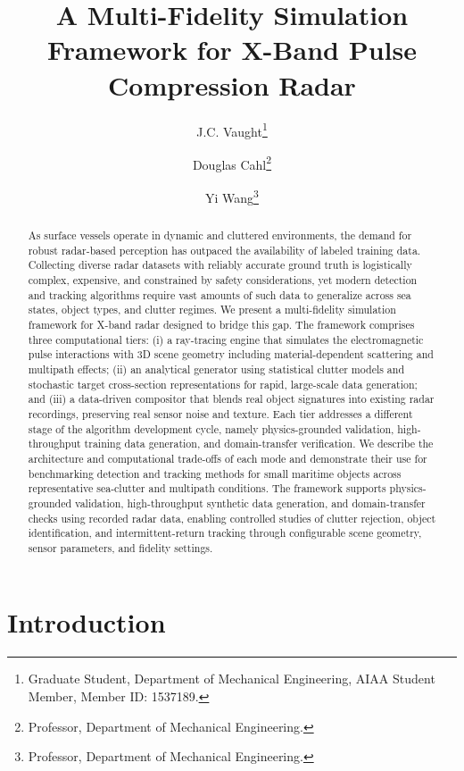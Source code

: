 \documentclass[conf]{new-aiaa}
\title{A Multi-Fidelity Simulation Framework for X-Band Pulse Compression Radar}
\author{J.C. Vaught\footnote{Graduate Student, Department of Mechanical Engineering, AIAA Student Member, Member ID: 1537189.}}
\author{Douglas Cahl\footnote{Professor, Department of Mechanical Engineering.}}
\author{Yi Wang\footnote{Professor, Department of Mechanical Engineering.}}
\affil{Department of Mechanical Engineering, University of South Carolina, Columbia, SC, 29208}
\begin{document}
\maketitle

\begin{abstract}
As surface vessels operate in dynamic and cluttered environments, the demand for robust radar-based perception has outpaced the availability of labeled training data. Collecting diverse radar datasets with reliably accurate ground truth is logistically complex, expensive, and constrained by safety considerations, yet modern detection and tracking algorithms require vast amounts of such data to generalize across sea states, object types, and clutter regimes. We present a multi-fidelity simulation framework for X-band radar designed to bridge this gap. The framework comprises three computational tiers: (i) a ray-tracing engine that simulates the electromagnetic pulse interactions with 3D scene geometry including material-dependent scattering and multipath effects; (ii) an analytical generator using statistical clutter models and stochastic target cross-section representations for rapid, large-scale data generation; and (iii) a data-driven compositor that blends real object signatures into existing radar recordings, preserving real sensor noise and texture. Each tier addresses a different stage of the algorithm development cycle, namely physics-grounded validation, high-throughput training data generation, and domain-transfer verification. We describe the architecture and computational trade-offs of each mode and demonstrate their use for benchmarking detection and tracking methods for small maritime objects across representative sea-clutter and multipath conditions. The framework supports physics-grounded validation, high-throughput synthetic data generation, and domain-transfer checks using recorded radar data, enabling controlled studies of clutter rejection, object identification, and intermittent-return tracking through configurable scene geometry, sensor parameters, and fidelity settings.
\end{abstract}

\section{Introduction}
\end{document}
